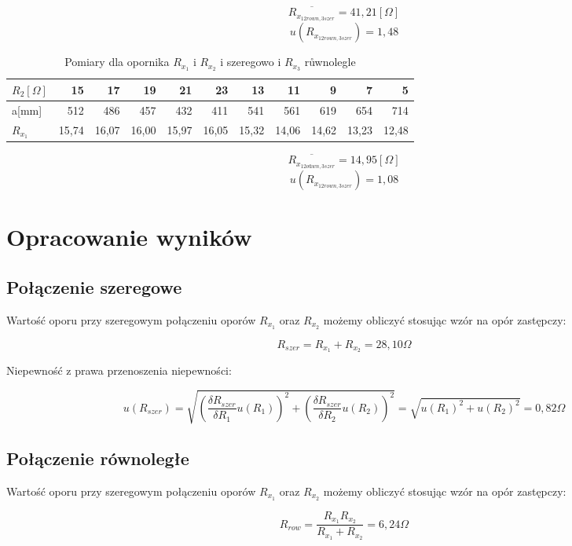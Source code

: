\documentclass[a4paper,10pt,twoside]{article}
\begin{document}
$$\overline{R_{x_{12rown,3szer}}}=41,21 [\Omega]$$
$$u(R_{x_{12rown,3szer}})=1,48$$
\begin{table}
	\centering
	\begin{tabular}{|l|r|r|r|r|r|r|r|r|r|r|}
		\hline
		$R_2[\Omega]$  & 15& 17   & 19    & 21    & 23   & 13   & 11    & 9      & 7      & 5    \\
		\hline
		a[mm]  & 512   & 486  & 457 & 432 & 411  & 541  & 561  & 619 & 654   & 714   \\
		\hline
		$R_{x_1}$ & 15,74 & 16,07 & 16,00 & 15,97 & 16,05 & 15,32 & 14,06 & 14,62 & 13,23 & 12,48\\
		\hline                      
	\end{tabular}
	\caption{Pomiary dla opornika $R_{x_1}$ i $R_{x_2}$ i szeregowo i $R_{x_3}$ růwnolegle}
	\label{tab:Rx1}
	$$\overline{R_{x_{12oůwn,3szer}}}=14,95 [\Omega]$$
	$$u(R_{x_{12rown,3szer}})=1,08$$
\end{table}

\newpage

\section{Opracowanie wyników}

\subsection{Połączenie szeregowe}

Wartość oporu przy szeregowym połączeniu oporów $R_{x_1}$ oraz $R_{x_2}$ możemy obliczyć stosując wzór na opór zastępczy:

$$ R_{szer} = R_{x_1} + R_{x_2} = 28,10 \unit{\Omega} $$

Niepewność z prawa przenoszenia niepewności:

$$ u(R_{szer}) = \sqrt{\left( \frac{\delta R_{szer}}{\delta R_1}u(R_1) \right)^2 + \left( \frac{\delta R_{szer}}{\delta R_2}u(R_2) \right)^2 }= \sqrt{u(R_1)^2 + u(R_2)^2} = 0,82 \unit{\Omega}$$


\subsection{Połączenie równoległe}

Wartość oporu przy szeregowym połączeniu oporów $R_{x_1}$ oraz $R_{x_2}$ możemy obliczyć stosując wzór na opór zastępczy:

$$ R_{row} = \frac{R_{x_1} R_{x_2}}{R_{x_1} + R_{x_2}} = 6,24 \unit{\Omega} $$
\end{document}
